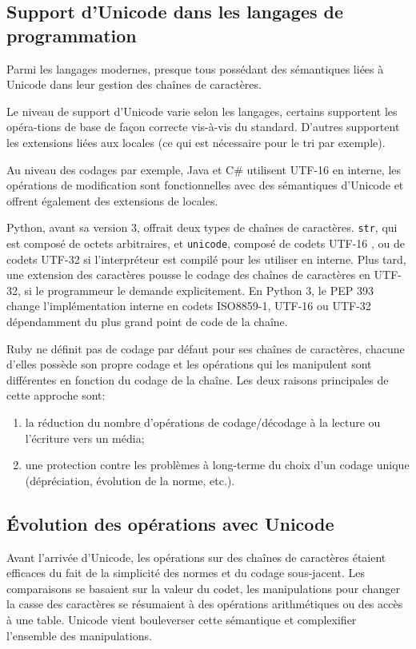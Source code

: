 \subsection{Support d'Unicode dans les langages de programmation}

Parmi les langages modernes, presque tous possédant des sémantiques liées à Unicode dans leur
gestion des chaînes de caractères.

Le niveau de support d'Unicode varie selon les langages, certains supportent les
opéra-tions de base de façon correcte vis-à-vis du standard.
D'autres supportent les extensions liées aux locales (ce qui est nécessaire pour
le tri par exemple).

Au niveau des codages par exemple, Java et C\# utilisent UTF-16 en interne,
les opérations de modification sont fonctionnelles avec des sémantiques
d'Unicode et offrent également des extensions de locales.

Python, avant sa version 3, offrait deux types de chaînes de caractères.
\texttt{str}, qui est composé de octets arbitraires, et \texttt{unicode}, composé
de codets UTF-16 \cite{PEP100}, ou de codets UTF-32 si l'interpréteur est compilé
pour les utiliser en interne.
Plus tard, une extension des caractères pousse le codage
des chaînes de caractères en UTF-32, si le programmeur le demande
explicitement.
En Python 3, le PEP 393 \cite{PEP393} change l'implémentation interne en codets ISO8859-1,
UTF-16 ou UTF-32 dépendamment du plus grand point de code de la chaîne.

Ruby ne définit pas de codage par défaut pour ses chaînes de caractères,
chacune d'elles possède son propre codage et les opérations qui les
manipulent sont différentes en fonction du codage de la chaîne.
Les deux raisons principales de cette approche sont:
\begin{enumerate}
	\item la réduction du nombre d'opérations de codage/décodage à la lecture ou l'écriture vers un média;
	\item une protection contre les problèmes à long-terme du choix d'un codage unique (dépréciation, évolution
de la norme, etc.).
\end{enumerate}

\subsection{Évolution des opérations avec Unicode}\label{unicode_troubles}

Avant l'arrivée d'Unicode, les opérations sur des chaînes de caractères étaient efficaces du fait
de la simplicité des normes et du codage sous-jacent.
Les comparaisons se basaient sur la valeur du codet, les manipulations pour changer la casse
des caractères se résumaient à des opérations arithmétiques ou des accès à une table.
Unicode vient bouleverser cette sémantique et complexifier l'ensemble des manipulations.


